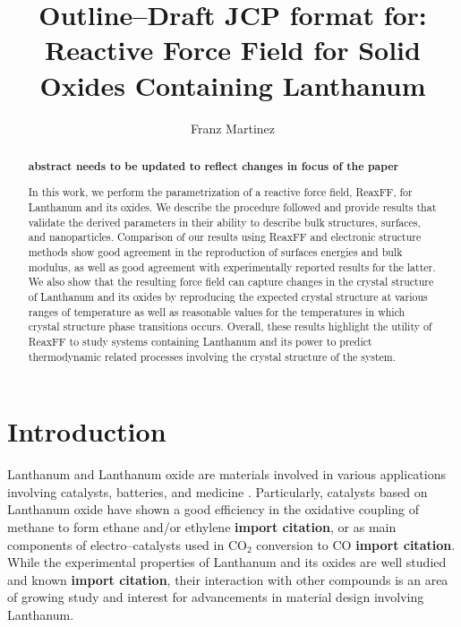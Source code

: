 \documentclass[journal=jpcafh,manuscript=article]{achemso}
\author{Franz Martinez}
\affiliation{Schulich School of Engineering, University of Calgary, Calgary, Alberta, Canada}
\title{Outline--Draft JCP format for: Reactive Force Field for Solid Oxides Containing Lanthanum}
\begin{document}
\begin{abstract}
\textbf{abstract needs to be updated to reflect changes in focus of the paper}


In this work, we perform the parametrization of a reactive force field, ReaxFF, for Lanthanum and its oxides.
We describe the procedure followed and provide results that validate the derived parameters in their ability to describe bulk structures, surfaces, and nanoparticles.
Comparison of our results using ReaxFF and electronic structure methods show good agreement in the reproduction of surfaces energies and bulk modulus, as well as good agreement with experimentally reported results for the latter.
We also show that the resulting force field can capture changes in the crystal structure of Lanthanum and its oxides by reproducing the expected crystal structure at various ranges of temperature as well as reasonable values for the temperatures in which crystal structure phase transitions occurs.
Overall, these results highlight the utility of ReaxFF to study systems containing Lanthanum and its power to predict thermodynamic related processes involving the crystal structure of the system.


\end{abstract}


\section{Introduction}

Lanthanum and Lanthanum oxide are materials involved in various applications involving catalysts, batteries, and medicine \cite{atwood2013rare,he2013preparation}.
Particularly, catalysts based on Lanthanum oxide have shown a good efficiency in the oxidative coupling of methane to form ethane and/or ethylene \textbf{import citation}, or as main components of electro--catalysts used in CO$_2$ conversion to CO \textbf{import citation}.
While the experimental properties of Lanthanum and its oxides are well studied and known \textbf{import citation}, their interaction with other compounds is an area of growing study and interest for advancements in material design involving Lanthanum.

\end{document}
